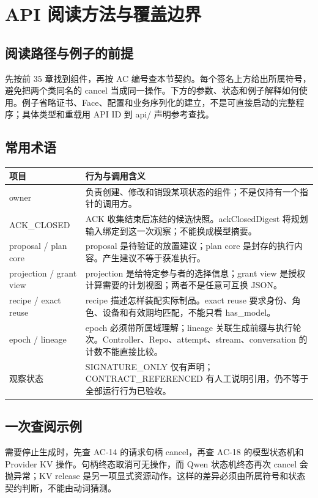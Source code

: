 \clearpage

\section{API 阅读方法与覆盖边界}

\subsection{阅读路径与例子的前提}
先按前 35 章找到组件，再按 AC 编号查本节契约。每个签名上方给出所属符号，避免把两个类同名的 cancel 当成同一操作。下方的参数、状态和例子解释如何使用。例子省略证书、Face、配置和业务序列化的建立，不是可直接启动的完整程序；具体类型和重载用 API ID 到 api/ 声明参考查找。

\subsection{常用术语}

\begin{longtable}{@{}p{43mm}p{119mm}@{}}
\toprule
项目 & 行为与调用含义 \\
\midrule\endhead
owner & 负责创建、修改和销毁某项状态的组件；不是仅持有一个指针的调用方。 \\
ACK\_CLOSED & ACK 收集结束后冻结的候选快照。ackClosedDigest 将规划输入绑定到这一次观察；不能换成模型摘要。 \\
proposal / plan core & proposal 是待验证的放置建议；plan core 是封存的执行内容。产生建议不等于获准执行。 \\
projection / grant view & projection 是给特定参与者的选择信息；grant view 是授权计算需要的计划视图；两者不是任意可互换 JSON。 \\
recipe / exact reuse & recipe 描述怎样装配实际制品。exact reuse 要求身份、角色、设备和有效期均匹配，不能只看 has\_model。 \\
epoch / lineage & epoch 必须带所属域理解；lineage 关联生成前缀与执行轮次。Controller、Repo、attempt、stream、conversation 的计数不能直接比较。 \\
观察状态 & SIGNATURE\_ONLY 仅有声明；CONTRACT\_REFERENCED 有人工说明引用，仍不等于全部运行行为已验收。 \\
\bottomrule
\end{longtable}

\subsection{一次查阅示例}
需要停止生成时，先查 AC-14 的请求句柄 cancel，再查 AC-18 的模型状态机和 Provider KV 操作。句柄终态取消可无操作，而 Qwen 状态机终态再次 cancel 会抛异常；KV release 是另一项显式资源动作。这样的差异必须由所属符号和状态契约判断，不能由动词猜测。


